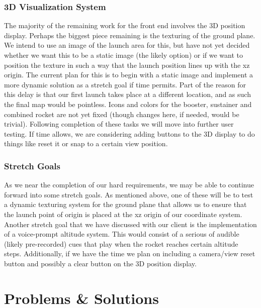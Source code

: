 \documentclass[journal,10pt,onecolumn,compsoc]{IEEEtran}
\begin{document}
    \subsubsection{3D Visualization System}
			The majority of the remaining work for the front end involves the 3D position display.
			Perhaps the biggest piece remaining is the texturing of the ground plane.
			We intend to use an image of the launch area for this, but have not yet decided whether we want this to be a static image (the likely option) or if we want to position the texture in such a way that the launch position lines up with the xz origin.
			The current plan for this is to begin with a static image and implement a more dynamic solution as a stretch goal if time permits.
			Part of the reason for this delay is that our first launch takes place at a different location, and as such the final map would be pointless.
      Icons and colors for the booster, sustainer and combined rocket are not yet fixed (though changes here, if needed, would be trivial).
			Following completion of these tasks we will move into further user testing.
			If time allows, we are considering adding buttons to the 3D display to do things like reset it or snap to a certain view position.
		
    \subsubsection{Stretch Goals}
			As we near the completion of our hard requirements, we may be able to continue forward into some stretch goals.
			As mentioned above, one of these will be to test a dynamic texturing system for the ground plane that allows us to ensure that the launch point of origin is placed at the xz origin of our coordinate system.
			Another stretch goal that we have discussed with our client is the implementation of a voice-prompt altitude system.
			This would consist of a serious of audible (likely pre-recorded) cues that play when the rocket reaches certain altitude steps.
			Additionally, if we have the time we plan on including a camera/view reset button and possibly a clear button on the 3D position display.
\newpage


\section{Problems \& Solutions}
\end{document}
